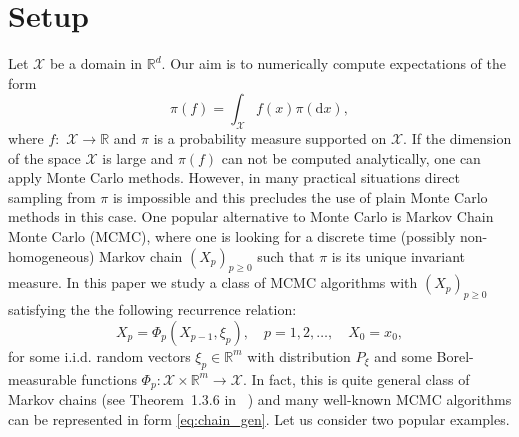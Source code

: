 \documentclass[preprint]{imsart}
\def\rmd{\mathrm{d}}
\begin{document}
\section{Setup}\label{sec:setup}
Let  \(\mathcal{X}\) be a domain in \( \mathbb{R}^d.\)  Our aim is to numerically compute  expectations of the form
\[
\pi(f)=\int_{\mathcal{X}} f(x)\pi(\rmd x),
\]
where \(f:\) \(\mathcal{X}\longrightarrow \mathbb{R}\) and \(\pi\) is a probability measure supported on \(\mathcal{X}.\)
If  the dimension of the space \(\mathcal{X}\) is large and \(\pi(f)\) can not be computed analytically, one can apply Monte Carlo methods. However, in many practical situations  direct sampling from \(\pi\) is impossible and this precludes the use of plain Monte Carlo methods in this case. One popular alternative to Monte Carlo  is Markov Chain Monte Carlo (MCMC), where one is looking for a discrete time  (possibly non-homogeneous) Markov chain   \((X_p)_{p\geq 0}\) such that \(\pi\) is its unique invariant measure. In this paper we study a class of MCMC algorithms with \((X_p)_{p\geq 0}\) satisfying the  the following recurrence relation:
\begin{equation}
\label{eq:chain_gen}
X_{p}=\Phi_{p}(X_{p-1},\xi_{p}),\quad p=1,2,\ldots ,\quad X_{0}=x_0,
\end{equation}
for some i.i.d.  random vectors \(\xi_p\in \mathbb{R}^m\) with distribution \(P_{\xi}\)
and some Borel-measurable
functions $\Phi_{p}\colon\mathcal{X}\times\mathbb{R}^{m}\to\mathcal{X}.$
In fact, this is quite general class of Markov chains (see Theorem~1.3.6 in ~\cite{moulines2018})
and many well-known MCMC algorithms can be represented in form \eqref{eq:chain_gen}.
Let us consider two popular examples.
\end{document}
